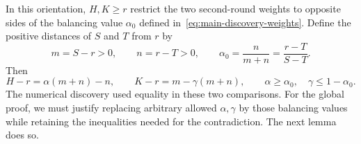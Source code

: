 \documentclass[11pt]{article}
\theoremstyle{remark}
\theoremstyle{plain}
\begin{document}
In this orientation, $H,K\ge r$ restrict the two second-round
weights to opposite sides of the balancing value $\alpha_0$ defined
in~\eqref{eq:main-discovery-weights}. Define the positive distances
of $S$ and $T$ from $r$ by
\begin{equation}
 m=S-r>0,\qquad n=r-T>0,\qquad
 \alpha_0=\frac n{m+n}=\frac{r-T}{S-T}.
 \label{eq:main-weight-balancing-values}
\end{equation}
Then
\begin{equation}
 H-r=\alpha(m+n)-n,\qquad K-r=m-\gamma(m+n),
 \qquad \alpha\ge \alpha_0,\quad\gamma\le1-\alpha_0.
 \label{eq:main-weight-source-restrictions}
\end{equation}
The numerical discovery used equality in these two comparisons.
For the global proof, we must justify replacing arbitrary allowed
$\alpha,\gamma$ by those balancing values while retaining the
inequalities needed for the contradiction. The next lemma does so.
\end{document}
